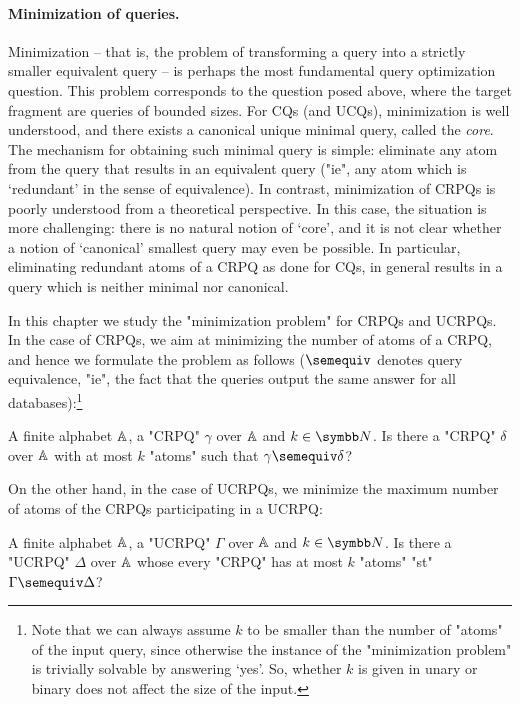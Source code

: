 \paragraph{Minimization of queries.}
Minimization -- that is, the problem of transforming a query into a strictly smaller equivalent 
query -- is perhaps the most fundamental query optimization question. This problem corresponds to the question posed above, where the target fragment are queries of bounded sizes. 
For CQs (and UCQs), minimization is well understood, and there exists a canonical unique minimal query, called the \emph{core}.
The mechanism for obtaining such minimal query is simple: eliminate any atom from the query that results in an equivalent query ("ie", any atom which is `redundant'  in the sense of equivalence).
In contrast, minimization of CRPQs is poorly understood from a theoretical perspective. In this case, the situation is more challenging: there is no natural notion of `core’, and it is not clear whether a notion of `canonical’ smallest query may even be possible. In particular, eliminating redundant atoms of a CRPQ as done for CQs, in general results in a query which is neither minimal nor canonical.

In this chapter we study the "minimization problem" for CRPQs and UCRPQs. In the case of CRPQs, we aim at minimizing the number of atoms of a CRPQ, and hence we formulate the problem as follows ($\semequiv$ denotes query equivalence, "ie", the fact that the queries output the same answer for all databases):\footnote{Note that we can always assume $k$ to be smaller than the number of "atoms" of the input query, since otherwise the instance of the "minimization problem" is trivially solvable by answering `yes'. So, whether $k$ is given in unary or binary does not affect the size of the input.}

{A finite alphabet $\mathbb{A}$, a "CRPQ" $\gamma$ over $\mathbb{A}$ and $k \in \N$.}
{Is there a "CRPQ" $\delta$ over $\mathbb{A}$ with at most $k$ "atoms" 
such that $\gamma \semequiv \delta$?}
\medskip

On the other hand, in the case of UCRPQs, we minimize the maximum number of atoms of the CRPQs participating in a UCRPQ:
	
{A finite alphabet $\mathbb{A}$, a "UCRPQ" $\Gamma$ over $\mathbb{A}$ and $k \in \N$.}
{Is there a "UCRPQ" $\Delta$ over $\mathbb{A}$ whose every "CRPQ" has at most $k$ "atoms" 
"st" $\Gamma \semequiv \Delta$?}
\medskip

